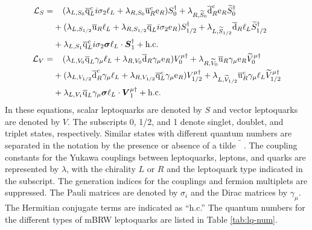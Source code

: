 \documentclass[12pt]{thesis}  %
\newcommand{\Pe}{\ensuremath{\cmsSymbolFace{e}}\xspace}
\begin{document}
\begin{align}
\label{eq:Lagrangian-SLQ}
\mathcal{L}_{S} = &\hphantom{+~}(\lambda_{L,S_{0}} \overline{\cPq}_{L}^{c} i\sigma_{2} \ell_{L} + \lambda_{R,S_{0}} \overline{\cPqu}_{R}^{c} \Pe_{R})S_{0}^{\dagger}
+ \lambda_{R,\widetilde{S}_{0}} \overline{\cPqd}_{R}^{c} \Pe_{R} \widetilde{S}_{0}^{\dagger} \nonumber \\
&+ (\lambda_{L,S_{1/2}} \overline{\cPqu}_{R} \ell_{L} + \lambda_{R,S_{1/2}} \overline{\cPq}_{L} i\sigma_{2} \Pe_{R})S_{1/2}^{\dagger}
+ \lambda_{L,\widetilde{S}_{1/2}} \overline{\cPqd}_{R} \ell_{L} \widetilde{S}_{1/2}^{\dagger} \nonumber \\
&+ \lambda_{L,S_{1}} \overline{\cPq}_{L}^{c} i\sigma_{2}\boldsymbol{\sigma} \ell_{L} \cdot \boldsymbol{S}_{1}^{\dagger} + \text{h.c.} \\
\label{eq:Lagrangian-VLQ}
\mathcal{L}_{V} = &\hphantom{+~}(\lambda_{L,V_{0}} \overline{\cPq}_{L} \gamma_{\mu} \ell_{L} + \lambda_{R,V_{0}} \overline{\cPqd}_{R} \gamma_{\mu} \Pe_{R})V_{0}^{\mu\dagger}
+ \lambda_{R,\widetilde{V}_{0}} \overline{\cPqu}_{R} \gamma_{\mu} \Pe_{R} \widetilde{V}_{0}^{\mu\dagger} \nonumber \\
&+ (\lambda_{L,V_{1/2}} \overline{\cPqd}_{R}^{c} \gamma_{\mu} \ell_{L} + \lambda_{R,V_{1/2}} \overline{\cPq}_{L}^{c} \gamma_{\mu} \Pe_{R})V_{1/2}^{\mu\dagger}
+ \lambda_{L,\widetilde{V}_{1/2}} \overline{\cPqu}_{R}^{c} \gamma_{\mu} \ell_{L} \widetilde{V}_{1/2}^{\mu\dagger} \nonumber \\
&+ \lambda_{L,V_{1}} \overline{\cPq}_{L} \gamma_{\mu}\boldsymbol{\sigma} \ell_{L} \cdot \boldsymbol{V}_{1}^{\mu\dagger} + \text{h.c.}
\end{align}
In these equations, scalar leptoquarks are denoted by $S$ and vector leptoquarks are denoted by $V$. The subscripts 0, 1/2, and 1 denote singlet, doublet, and triplet states, respectively. Similar states with different quantum numbers are separated in the notation by the presence or absence of a tilde $\widetilde{\phantom{S}}$. The coupling constants for the Yukawa couplings between leptoquarks, leptons, and quarks are represented by $\lambda$, with the chirality $L$ or $R$ and the leptoquark type indicated in the subscript. The generation indices for the couplings and fermion multiplets are suppressed. The Pauli matrices are denoted by $\sigma_{i}$ and the Dirac matrices by $\gamma_{\mu}$. The Hermitian conjugate terms are indicated as ``h.c.'' The quantum numbers for the different types of mBRW leptoquarks are listed in Table \ref{tab:lq-num}.
\end{document}
